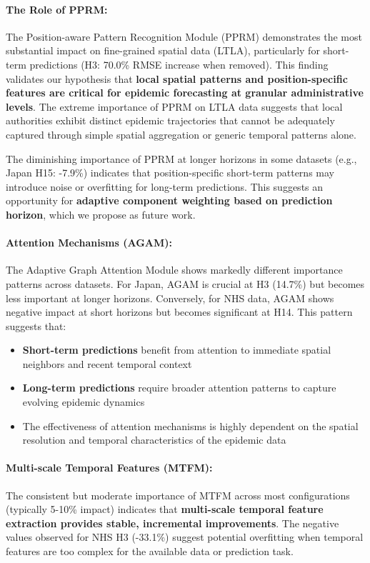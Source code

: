 \documentclass[11pt,a4paper]{article}
\begin{document}
\paragraph{The Role of PPRM:} The Position-aware Pattern Recognition Module (PPRM) demonstrates the most substantial impact on fine-grained spatial data (LTLA), particularly for short-term predictions (H3: 70.0\% RMSE increase when removed). This finding validates our hypothesis that \textbf{local spatial patterns and position-specific features are critical for epidemic forecasting at granular administrative levels}. The extreme importance of PPRM on LTLA data suggests that local authorities exhibit distinct epidemic trajectories that cannot be adequately captured through simple spatial aggregation or generic temporal patterns alone.

The diminishing importance of PPRM at longer horizons in some datasets (e.g., Japan H15: -7.9\%) indicates that position-specific short-term patterns may introduce noise or overfitting for long-term predictions. This suggests an opportunity for \textbf{adaptive component weighting based on prediction horizon}, which we propose as future work.

\paragraph{Attention Mechanisms (AGAM):} The Adaptive Graph Attention Module shows markedly different importance patterns across datasets. For Japan, AGAM is crucial at H3 (14.7\%) but becomes less important at longer horizons. Conversely, for NHS data, AGAM shows negative impact at short horizons but becomes significant at H14. This pattern suggests that:

\begin{itemize}
    \item \textbf{Short-term predictions} benefit from attention to immediate spatial neighbors and recent temporal context
    \item \textbf{Long-term predictions} require broader attention patterns to capture evolving epidemic dynamics
    \item The effectiveness of attention mechanisms is highly dependent on the spatial resolution and temporal characteristics of the epidemic data
\end{itemize}

\paragraph{Multi-scale Temporal Features (MTFM):} The consistent but moderate importance of MTFM across most configurations (typically 5-10\% impact) indicates that \textbf{multi-scale temporal feature extraction provides stable, incremental improvements}. The negative values observed for NHS H3 (-33.1\%) suggest potential overfitting when temporal features are too complex for the available data or prediction task.
\end{document}
